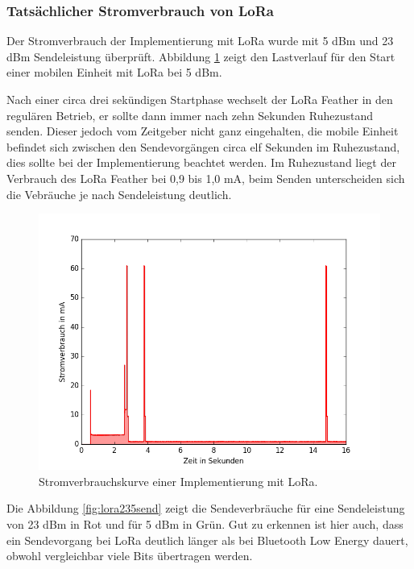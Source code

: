 \subsubsection{Tatsächlicher Stromverbrauch von LoRa}
\label{ch:phase3:sec:powerlora}
Der Stromverbrauch der Implementierung mit LoRa wurde mit 5 dBm und 23 dBm Sendeleistung überprüft.
Abbildung \ref{fig:lora5} zeigt den Lastverlauf für den Start einer mobilen Einheit mit LoRa bei 5 dBm.

Nach einer circa drei sekündigen Startphase wechselt der LoRa Feather in den regulären Betrieb, er sollte dann immer nach zehn Sekunden Ruhezustand senden.
Dieser jedoch vom Zeitgeber nicht ganz eingehalten, die mobile Einheit befindet sich zwischen den Sendevorgängen circa elf Sekunden im Ruhezustand, dies sollte bei der Implementierung beachtet werden.
Im Ruhezustand liegt der Verbrauch des LoRa Feather bei 0,9 bis 1,0 mA, beim Senden unterscheiden sich die Vebräuche je nach Sendeleistung deutlich.

\begin{figure}[h!]
  \centering
	\includegraphics[width=\textwidth]{plots/lora5.png}
  \caption{Stromverbrauchskurve einer Implementierung mit LoRa.}
  \label{fig:lora5}
\end{figure}

Die Abbildung \ref{fig:lora235send} zeigt die Sendeverbräuche für eine Sendeleistung von 23 dBm in Rot und für 5 dBm in Grün.
Gut zu erkennen ist hier auch, dass ein Sendevorgang bei LoRa deutlich länger als bei Bluetooth Low Energy dauert, obwohl vergleichbar viele Bits übertragen werden.

